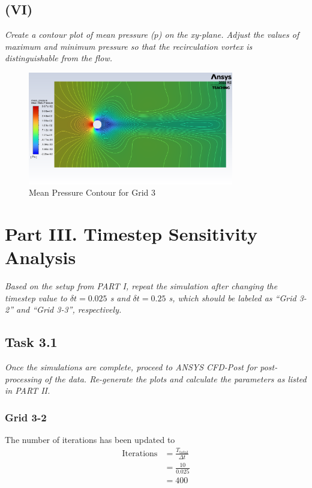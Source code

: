 \subsection{(VI)}
\textit{Create a contour plot of mean pressure ($p$) on the xy-plane. Adjust the values of maximum and minimum pressure so that the recirculation vortex is distinguishable from the flow.}
\begin{figure}[H]
    \centering
    \includegraphics[width=0.8\textwidth]{Questions/Figures/mean pressure velocity contour grid 3.png}
    \caption{Mean Pressure Contour for Grid 3}
    \label{fig:mean pressure velocity contour grid 3}
\end{figure}

\section{Part III. Timestep Sensitivity Analysis}
\textit{Based on the setup from PART I, repeat the simulation after changing the timestep value to $\delta t = 0.025$ s and $\delta t = 0.25$ s, which should be labeled as “Grid 3-2” and “Grid 3-3”, respectively.}
\subsection{Task 3.1}
\textit{Once the simulations are complete, proceed to ANSYS CFD-Post for post-processing of the data. Re-generate the plots and calculate the parameters as listed in PART II.}
\subsubsection{Grid 3-2}
The number of iterations has been updated to
\begin{align*}
    \text{Iterations} &= \frac{T_{\text{total}}}{\Delta t} \\
    &= \frac{10}{0.025} \\
    &= \boxed{400}
\end{align*}

